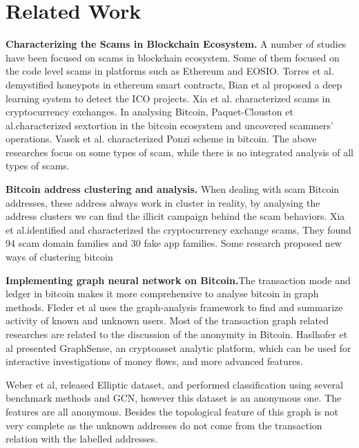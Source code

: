 \section{Related Work}
\label{sec:related}
\noindent\textbf{Characterizing the Scams in Blockchain Ecosystem.}
A number of studies have been focused on scams in blockchain ecosystem. Some of them focused on the code level scams in platforms such as Ethereum and EOSIO. Torres et al.\cite{torres2019art} demystified  honeypots in ethereum smart contracts, Bian et al proposed a deep learning system to detect the ICO projects\cite{bian2018icorating}. Xia et al. \cite{xia2020characterizing}characterized scams in cryptocurrency exchanges. In analysing Bitcoin, Paquet-Clouston et al.\cite{paquet2019spams}characterized sextortion in the bitcoin ecosystem and uncovered scammers' operations. Vasek et al.\cite{vasek2018analyzing} characterized Ponzi scheme in bitcoin. The above researches focus on some types of scam, while there is no integrated analysis of all types of scams.


\noindent\textbf{Bitcoin address clustering and analysis.}
When dealing with scam Bitcoin addresses, these address always work in cluster in reality, by analysing the address clusters we can find the illicit campaign behind the scam behaviors. Xia et al.\cite{xia2020characterizing}identified and characterized the cryptocurrency exchange scams, They found 94 scam domain families and 30 fake app families. Some research proposed new ways of clustering bitcoin\cite{ermilov2017automatic, zhang2020heuristic}

\noindent\textbf{Implementing graph neural network on Bitcoin.}The transaction mode and ledger in bitcoin makes it more comprehensive to analyse bitcoin in graph methods.  Fleder et al uses the graph-analysis framework to find and summarize activity of known and unknown users\cite{fleder2015bitcoin}. Most of the transaction graph related researches are related to the discussion of the anonymity in Bitcoin. Haslhofer et al presented GraphSense, an cryptoasset analytic platform, which can be used for interactive investigations of money flows, and more advanced features\cite{haslhofer2021graphsense}.

Weber et al, released Elliptic dataset, and performed classification using several benchmark methods and GCN\cite{weber2019anti}, however this dataset is an anonymous one. The features are all anonymous. Besides the topological feature of this graph is not very complete as the unknown addresses do not come from the transaction relation with the labelled addresses.